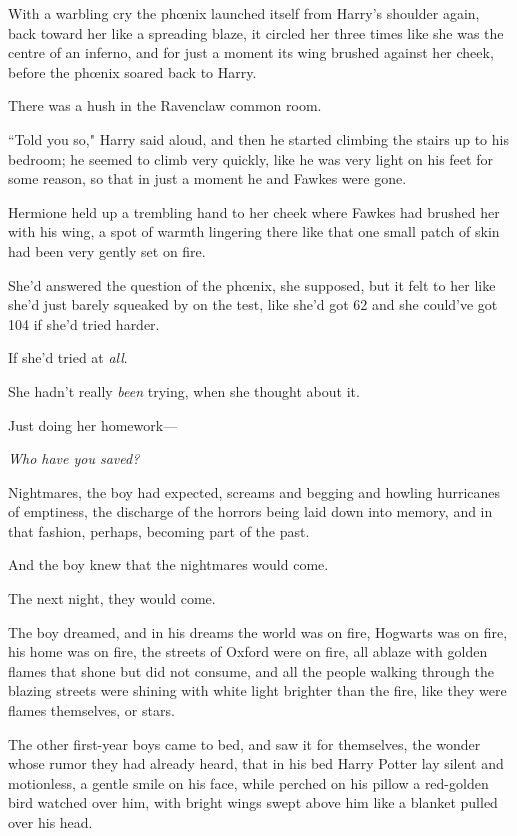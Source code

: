 With a warbling cry the phœnix launched itself from Harry's shoulder again, back toward her like a spreading blaze, it circled her three times like she was the centre of an inferno, and for just a moment its wing brushed against her cheek, before the phœnix soared back to Harry.

There was a hush in the Ravenclaw common room.

``Told you so," Harry said aloud, and then he started climbing the stairs up to his bedroom; he seemed to climb very quickly, like he was very light on his feet for some reason, so that in just a moment he and Fawkes were gone.

Hermione held up a trembling hand to her cheek where Fawkes had brushed her with his wing, a spot of warmth lingering there like that one small patch of skin had been very gently set on fire.

She'd answered the question of the phœnix, she supposed, but it felt to her like she'd just barely squeaked by on the test, like she'd got 62 and she could've got 104 if she'd tried harder.

If she'd tried at \emph{all}.

She hadn't really \emph{been} trying, when she thought about it.

Just doing her homework---

\emph{Who have you saved?}


Nightmares, the boy had expected, screams and begging and howling hurricanes of emptiness, the discharge of the horrors being laid down into memory, and in that fashion, perhaps, becoming part of the past.

And the boy knew that the nightmares would come.

The next night, they would come.

The boy dreamed, and in his dreams the world was on fire, Hogwarts was on fire, his home was on fire, the streets of Oxford were on fire, all ablaze with golden flames that shone but did not consume, and all the people walking through the blazing streets were shining with white light brighter than the fire, like they were flames themselves, or stars.

The other first-year boys came to bed, and saw it for themselves, the wonder whose rumor they had already heard, that in his bed Harry Potter lay silent and motionless, a gentle smile on his face, while perched on his pillow a red-golden bird watched over him, with bright wings swept above him like a blanket pulled over his head.

